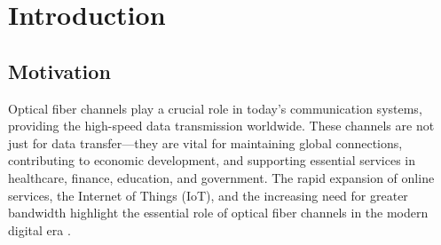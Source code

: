 \cleardoublepage
\chapter*{Introduction}


\section*{Motivation}


Optical fiber channels play a crucial role in today's communication systems, providing the high-speed data transmission worldwide. These channels are not just for data transfer—they are vital for maintaining global connections, contributing to economic development, and supporting essential services in healthcare, finance, education, and government. The rapid expansion of online services, the Internet of Things (IoT), and the increasing need for greater bandwidth highlight the essential role of optical fiber channels in the modern digital era \cite{cambridge2022, aip2022}.



